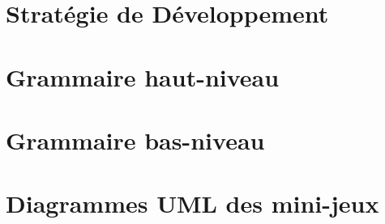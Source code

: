 \documentclass[a4paper,10pt]{article}
\begin{document}
\section{Stratégie de Développement}
\label{sec:strategie}


\clearpage
\appendix

\section{Grammaire haut-niveau}
\label{sec:hautniveau}


\section{Grammaire bas-niveau}
\label{sec:basniveau}


\clearpage
\section{Diagrammes UML des mini-jeux}
\label{sec:uml}

\end{document}

